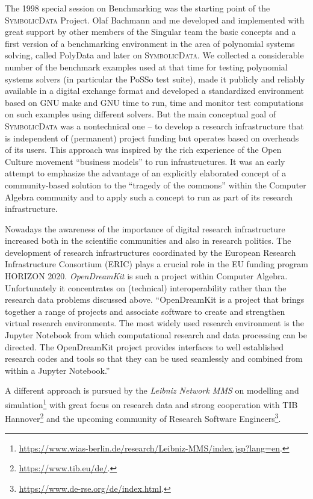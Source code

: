 \documentclass[12pt]{article}
\def\SD{\textsc{Sym\-bolic\-Data}}
\begin{document}
The 1998 special session on Benchmarking was the starting point of the {\SD}
Project. Olaf Bachmann and me developed and implemented with great support by
other members of the Singular team the basic concepts and a first version of a
benchmarking environment in the area of polynomial systems solving, called {\sc
  PolyData} and later on {\SD}.  We collected a considerable number of the
benchmark examples used at that time for testing polynomial systems solvers (in
particular the PoSSo test suite), made it publicly and reliably available in a
digital exchange format and developed a standardized environment based on GNU
make and GNU time to run, time and monitor test computations on such examples
using different solvers. But the main conceptual goal of {\SD} was a
nontechnical one – to develop a research infrastructure that is independent of
(permanent) project funding but operates based on overheads of its users. This
approach was inspired by the rich experience of the Open Culture movement
“business models” to run infrastructures. It was an early attempt to emphasize
the advantage of an explicitly elaborated concept of a community-based solution
to the “tragedy of the commons” within the Computer Algebra community and to
apply such a concept to run as part of its research infrastructure.

Nowadays the awareness of the importance of digital research infrastructure
increased both in the scientific communities and also in research politics.
The development of research infrastructures coordinated by the European
Research Infrastructure Consortium (ERIC) plays a crucial role in the EU
funding program HORIZON 2020. \emph{OpenDreamKit} is such a project within
Computer Algebra.  Unfortunately it concentrates on (technical)
interoperability rather than the research data problems discussed above.
``OpenDreamKit is a project that brings together a range of projects and
associate software to create and strengthen virtual research environments. The
most widely used research environment is the Jupyter Notebook from which
computational research and data processing can be directed. The OpenDreamKit
project provides interfaces to well established research codes and tools so
that they can be used seamlessly and combined from within a Jupyter Notebook.''

A different approach is pursued by the \emph{Leibniz Network MMS} on modelling
and
simulation\footnote{\url{https://www.wias-berlin.de/research/Leibniz-MMS/index.jsp?lang=en}.}
with great focus on research data and strong cooperation with TIB
Hannover\footnote{\url{https://www.tib.eu/de/}.} and the upcoming community of 
Research Software
Engineers\footnote{\url{https://www.de-rse.org/de/index.html}.}. 
\end{document}
